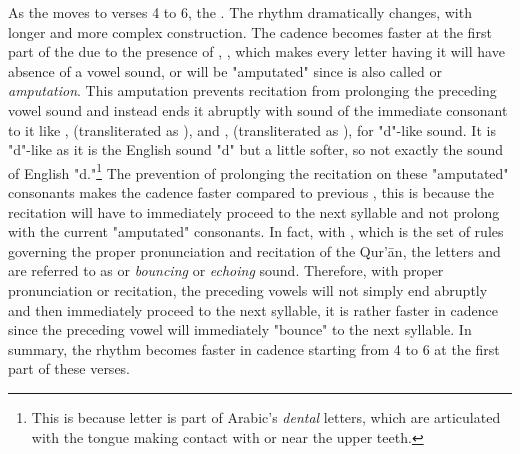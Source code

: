 As the   moves to verses 4 to 6, the  . The rhythm dramatically changes, with longer and more complex construction. The cadence becomes faster at the first part of the   due to the presence of  , , which makes every letter having it will have absence of a vowel sound, or will be "amputated" since   is also called   or \textit{amputation}. This amputation prevents recitation from prolonging the preceding vowel sound and instead ends it abruptly with sound of the immediate consonant to it like  ,  (transliterated as ), and  ,  (transliterated as ), for "d"-like sound. It is "d"-like as it is the English sound "d" but a little softer, so not exactly the sound of English "d."\footnote{This is because   letter is part of Arabic's \textit{dental} letters, which are articulated with the tongue making contact with or near the upper teeth.} The prevention of prolonging the recitation on these "amputated" consonants makes the cadence faster compared to previous  , this is because the recitation will have to immediately proceed to the next syllable and not prolong with the current "amputated" consonants. In fact, with  , which is the set of rules governing the proper pronunciation and recitation of the Qur'\=an, the letters    and   are referred to as   or \textit{bouncing} or \textit{echoing} sound. Therefore, with proper pronunciation or recitation, the preceding vowels will not simply end abruptly and then immediately proceed to the next syllable, it is rather faster in cadence since the preceding vowel will immediately "bounce" to the next syllable. In summary, the rhythm becomes faster in cadence starting from   4 to 6 at the first part of these verses. 

